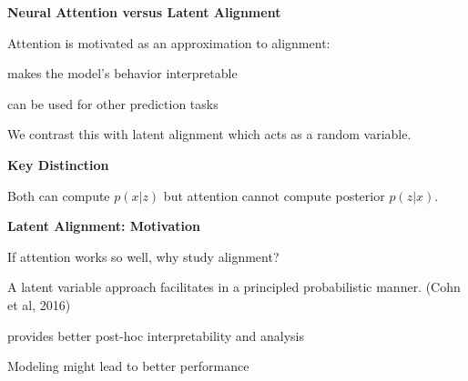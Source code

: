 \documentclass[aspectratio=169]{beamer}
\let\tempone\itemize
\let\temptwo\enditemize
\renewenvironment{itemize}{\tempone\addtolength{\itemsep}{0.5\baselineskip}}{\temptwo}
\newcommand{\thetitle}[1]{{\begin{center}\textbf{{#1}}\end{center}}}
\newcommand{\air}{\vspace{0.25cm}}
\begin{document}
\begin{frame}\thetitle{Neural Attention versus Latent Alignment}
\begin{itemize}
     \item Attention is motivated as an approximation to alignment:
        \begin{itemize}
            \item makes the model's behavior interpretable
            \item can be used for other prediction tasks
        \end{itemize}
    \air
    \air

    \item We contrast this with latent alignment which acts as a random variable.
      \air

    \end{itemize}
    \centerline{\textbf{Key Distinction}}
    \begin{itemize}
    \item Both can compute $p(x | z)$ but attention cannot compute
      posterior $p(z | x)$.
    \end{itemize}
\end{frame}



\begin{frame}\thetitle{Latent Alignment: Motivation}

If attention works so well, why study alignment?

\begin{itemize}
    \item A latent variable approach  facilitates   in a principled probabilistic manner. (Cohn et al, 2016)
    \air
    \item {} provides better post-hoc interpretability and analysis
    \air
    \item Modeling  might lead to better performance
\end{itemize}
\end{frame}
\end{document}
